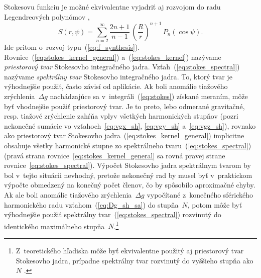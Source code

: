 \documentclass[a4paper, 12pt]{book}
\begin{document}
Stokesovu funkciu je možné ekvivalentne vyjadriť aj rozvojom do radu 
Legendreových polynómov \parencite{MoritzPhysicalGeodesy},
%
\begin{equation}
\label{eq:stokes_spectral}
S(r, \psi) = \sum_{n = 2}^{\infty} \frac{2n + 1}{n - 1} \, \left( \frac{R}{r} 
\right)^{n + 1} \, P_n(\cos\psi){.}
\end{equation}
%
Ide pritom o~rozvoj typu~(\ref{eq:f_synthesis}).  
Rovnice~(\ref{eq:stokes_kernel_general}) a~(\ref{eq:stokes_kernel}) nazývame 
\emph{priestorový tvar} Stokesovho integračného jadra.  
Vzťah~(\ref{eq:stokes_spectral}) nazývame \emph{spektrálny tvar} Stokesovho 
integračného jadra.  To, ktorý tvar je výhodnejšie použiť, často závisí od 
aplikácie.  Ak boli anomálie tiažového zrýchlenia~$\Delta g$ nachádzajúce sa 
v~integráli~(\ref{eq:stokes}) získané meraním, môže byť vhodnejšie použiť 
priestorový tvar.  Je to preto, lebo odmerané gravitačné, resp. tiažové 
zrýchlenie zahŕňa vplyv všetkých harmonických stupňov (pozri nekonečné sumácie 
vo vzťahoch~\ref{eq:vgx_sh}, \ref{eq:vgy_sh} a~\ref{eq:vgz_sh}), rovnako ako 
priestorový tvar Stokesovho jadra~(\ref{eq:stokes_kernel_general}) implicitne 
obsahuje všetky harmonické stupne zo spektrálneho 
tvaru~(\ref{eq:stokes_spectral}) (pravá strana 
rovnice~\ref{eq:stokes_kernel_general} sa rovná pravej strane 
rovnice~\ref{eq:stokes_spectral}).  Výpočet Stokesovho jadra spektrálnym tvarom 
by bol v~tejto situácii nevhodný, pretože nekonečný rad by musel byť 
v~praktickom výpočte obmedzený na konečný počet členov, čo by spôsobilo 
aproximačné chyby.  Ak ale boli anomálie tiažového zrýchlenia~$\Delta g$ 
vypočítané z~konečného sférického harmonického radu vzťahom~(\ref{eq:Dg_sh_sa}) 
do stupňa~$N$, potom môže byť výhodnejšie použiť spektrálny 
tvar~(\ref{eq:stokes_spectral}) rozvinutý do identického maximálneho 
stupňa~$N$.\footnote{Z~teoretického hľadiska môže byť ekvivalentne použitý aj 
priestorový tvar Stokesovho jadra, prípadne spektrálny tvar rozvinutý do 
vyššieho stupňa ako~$N$ \parencite[pozri napríklad][]{Freeden2009}.}
\end{document}
